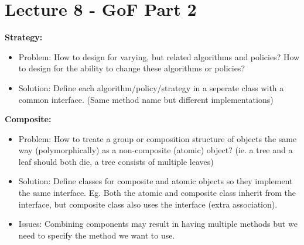 \documentclass[a4paper,10pt]{article}
\begin{document}
\section*{Lecture 8 - GoF Part 2}
\textcolor{Periwinkle}{\textbf{Strategy:}}
\renewcommand{\labelitemi}{\textperiodcentered}
\begin{itemize}
\item\textcolor{Periwinkle}{Problem:} How to design for varying, but related algorithms and policies? How to design for the ability to change these algorithms or policies?  
\item\textcolor{Periwinkle}{Solution:} Define each algorithm/policy/strategy in a seperate class with a common interface. (Same method name but different implementations)
\end{itemize}
\textcolor{Periwinkle}{\textbf{Composite:}}
\renewcommand{\labelitemi}{\textperiodcentered}
\begin{itemize}
\item\textcolor{Periwinkle}{Problem:} How to treate a group or composition structure of objects the same way (polymorphically) as a non-composite (atomic) object? (ie. a tree and a leaf should both die, a tree consists of multiple leaves)
\item\textcolor{Periwinkle}{Solution:} Define classes for composite and atomic objects so they implement the same interface. Eg. Both the atomic and composite class inherit from the interface, but composite class also uses the interface (extra association). 
\item\textcolor{Periwinkle}{Issues:} Combining components may result in having multiple methods but we need to specify the method we want to use.  
\end{itemize}
\end{document}
